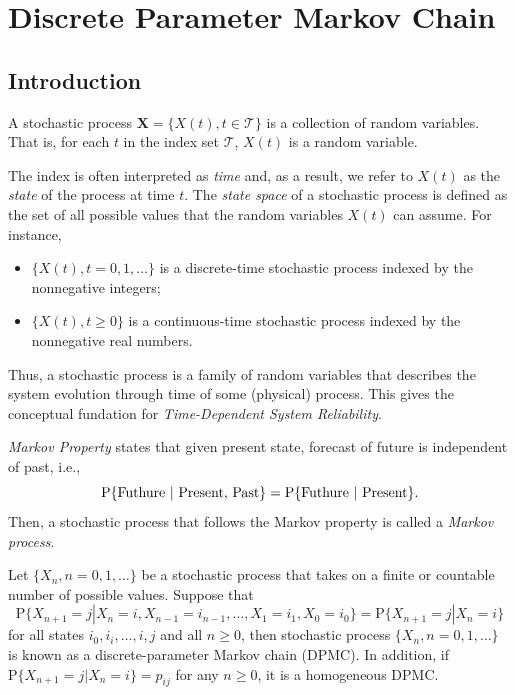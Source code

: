 \documentclass[../Note.tex]{subfiles}
\begin{document}
\chapter{Discrete Parameter Markov Chain} 


\section{Introduction}

\begin{definition}
    A stochastic process $\bm{X} = \{X(t), t \in \mathcal{T}\}$ is a collection of random variables. That is, for each $t$ in the index set $\mathcal{T}$, $X(t)$ is a random variable.
\end{definition}

The index is often interpreted as \textit{time} and, as a result, we refer to $X(t)$ as the \textit{state} of the process at time $t$. The \textit{state space} of a stochastic process is defined as the set of all possible values that the random variables $X(t)$ can assume. For instance,
\begin{itemize}
    \item $\{X(t), t = 0, 1, \dots\}$ is a discrete-time stochastic process indexed by the nonnegative integers;
    \item $\{X(t), t \geq 0\}$ is a continuous-time stochastic process indexed by the nonnegative real numbers. 
\end{itemize}
Thus, a stochastic process is a family of random variables that describes the system evolution through time of some (physical) process. This gives the conceptual fundation for \textit{Time-Dependent System Reliability}.

\textit{Markov Property} states that given present state, forecast of future is independent of past, i.e.,
\[
    \mathrm{P}\{\text{Futhure | \text{Present, Past}}\} = \mathrm{P}\{\text{Futhure | Present}\}.
\]
Then, a stochastic process that follows the Markov property is called a \textit{Markov process}.

\begin{definition}
    Let $\{X_n, n = 0, 1, \dots\}$ be a stochastic process that takes on a finite or countable number of possible values. Suppose that 
    \[
        \mathrm{P}\{X_{n+1} = j | X_{n} = i, X_{n-1} = i_{n-1}, \dots, X_{1} = i_{1}, X_{0} = i_{0}\} = \mathrm{P}\{X_{n+1} = j | X_{n} = i\}
    \]
    for all states $i_0, i_i, \dots, i, j$ and all $n \geq 0$, then stochastic process $\{X_n, n = 0, 1, \dots\}$ is known as a discrete-parameter Markov chain (DPMC). In addition, if $\mathrm{P}\{X_{n+1} = j | X_{n} = i\} = p_{ij}$ for any $n \geq 0$, it is a homogeneous DPMC.
\end{definition}
\end{document}
